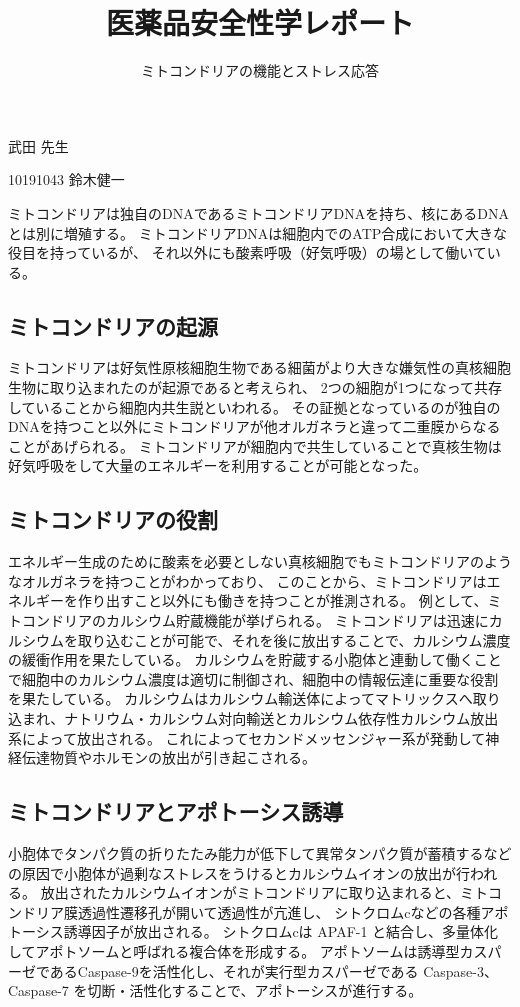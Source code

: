 \documentclass[a4paper,papersize,dvipdfmx]{jsarticle}
\begin{document}
\title{医薬品安全性学レポート}
\author{ミトコンドリアの機能とストレス応答}
\date{}
\maketitle



\begin{flushright}
武田 先生

10191043 鈴木健一
\end{flushright}

ミトコンドリアは独自のDNAであるミトコンドリアDNAを持ち、核にあるDNAとは別に増殖する。
ミトコンドリアDNAは細胞内でのATP合成において大きな役目を持っているが、
それ以外にも酸素呼吸（好気呼吸）の場として働いている。

\subsection*{ミトコンドリアの起源}
ミトコンドリアは好気性原核細胞生物である細菌がより大きな嫌気性の真核細胞生物に取り込まれたのが起源であると考えられ、
2つの細胞が1つになって共存していることから細胞内共生説といわれる。
その証拠となっているのが独自のDNAを持つこと以外にミトコンドリアが他オルガネラと違って二重膜からなることがあげられる。
ミトコンドリアが細胞内で共生していることで真核生物は好気呼吸をして大量のエネルギーを利用することが可能となった。

\subsection*{ミトコンドリアの役割}
エネルギー生成のために酸素を必要としない真核細胞でもミトコンドリアのようなオルガネラを持つことがわかっており、
このことから、ミトコンドリアはエネルギーを作り出すこと以外にも働きを持つことが推測される。
例として、ミトコンドリアのカルシウム貯蔵機能が挙げられる。
ミトコンドリアは迅速にカルシウムを取り込むことが可能で、それを後に放出することで、カルシウム濃度の緩衝作用を果たしている。
カルシウムを貯蔵する小胞体と連動して働くことで細胞中のカルシウム濃度は適切に制御され、細胞中の情報伝達に重要な役割を果たしている。
カルシウムはカルシウム輸送体によってマトリックスへ取り込まれ、ナトリウム・カルシウム対向輸送とカルシウム依存性カルシウム放出系によって放出される。
これによってセカンドメッセンジャー系が発動して神経伝達物質やホルモンの放出が引き起こされる。

\subsection*{ミトコンドリアとアポトーシス誘導}

小胞体でタンパク質の折りたたみ能力が低下して異常タンパク質が蓄積するなどの原因で小胞体が過剰なストレスをうけるとカルシウムイオンの放出が行われる。
放出されたカルシウムイオンがミトコンドリアに取り込まれると、ミトコンドリア膜透過性遷移孔が開いて透過性が亢進し、
シトクロムcなどの各種アポトーシス誘導因子が放出される。
シトクロムcは APAF-1 と結合し、多量体化してアポトソームと呼ばれる複合体を形成する。
アポトソームは誘導型カスパーゼであるCaspase-9を活性化し、それが実行型カスパーゼである Caspase-3、Caspase-7 を切断・活性化することで、アポトーシスが進行する。
\end{document}
